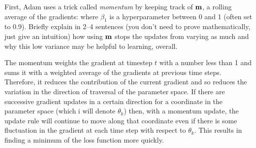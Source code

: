 \begin{parts}
\begin{subparts}
            \subpart[2]First, Adam uses a trick called {\it momentum} by keeping track of $\mathbf{m}$, a rolling average of the gradients:
                where $\beta_1$ is a hyperparameter between 0 and 1 (often set to  0.9). Briefly explain in 2--4 sentences (you don't need to prove mathematically, just give an intuition) how using $\mathbf{m}$ stops the updates from varying as much and why this low variance may be helpful to learning, overall.\newline
             \begin{shaded}
                \begin{answer}
                The momentum weights the gradient at timestep $t$ with a number less than 1 and sums it with a weighted
                average of the gradients at previous time steps. Therefore, it reduces the contribution of the current
                gradient and so reduces the variation in the direction of traversal of the parameter space. If there are successive gradient
                updates in a certain direction for a coordinate in the parameter space (which i will denote $\theta_k$) then, with a momentum update, the update rule will continue to move
                along that coordinate even if there is some fluctuation in the gradient at each time step with respect to $\theta_k$. This results
                in finding a minimum of the loss function more quickly.
            \end{answer}
             \end{shaded} 
                

\end{subparts}
\end{parts}
